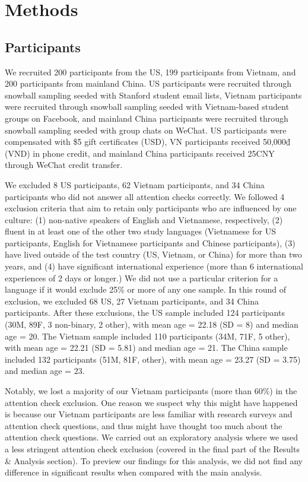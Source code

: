 \documentclass[10pt, letterpaper]{article}
\begin{document}
\hypertarget{methods}{%
\section{Methods}\label{methods}}

\hypertarget{participants}{%
\subsection{Participants}\label{participants}}

We recruited 200 participants from the US, 199 participants from
Vietnam, and 200 participants from mainland China. US participants were
recruited through snowball sampling seeded with Stanford student email
lists, Vietnam participants were recruited through snowball sampling
seeded with Vietnam-based student groups on Facebook, and mainland China
participants were recruited through snowball sampling seeded with group
chats on WeChat. US participants were compensated with \$5 gift
certificates (USD), VN participants received 50,000₫ (VND) in phone
credit, and mainland China participants received 25CNY through WeChat
credit transfer.

We excluded 8 US participants, 62 Vietnam participants, and 34 China
participants who did not answer all attention checks correctly. We
followed 4 exclusion criteria that aim to retain only participants who
are influenced by one culture: (1) non-native speakers of English and
Vietnamese, respectively, (2) fluent in at least one of the other two
study languages (Vietnamese for US participants, English for Vietnamese
participants and Chinese participants), (3) have lived outside of the
test country (US, Vietnam, or China) for more than two years, and (4)
have significant international experience (more than 6 international
experiences of 2 days or longer.) We did not use a particular criterion
for a language if it would exclude 25\% or more of any one sample. In
this round of exclusion, we excluded 68 US, 27 Vietnam participants, and
34 China participants. After these exclusions, the US sample included
124 participants (30M, 89F, 3 non-binary, 2 other), with mean age =
22.18 (SD = 8) and median age = 20. The Vietnam sample included 110
participants (34M, 71F, 5 other), with mean age = 22.21 (SD = 5.81) and
median age = 21. The China sample included 132 participants (51M, 81F,
other), with mean age = 23.27 (SD = 3.75) and median age = 23.

Notably, we lost a majority of our Vietnam participants (more than 60\%)
in the attention check exclusion. One reason we suspect why this might
have happened is because our Vietnam participants are less familiar with
research surveys and attention check questions, and thus might have
thought too much about the attention check questions. We carried out an
exploratory analysis where we used a less stringent attention check
exclusion (covered in the final part of the Results \& Analysis
section). To preview our findings for this analysis, we did not find any
difference in significant results when compared with the main analysis.
\end{document}
